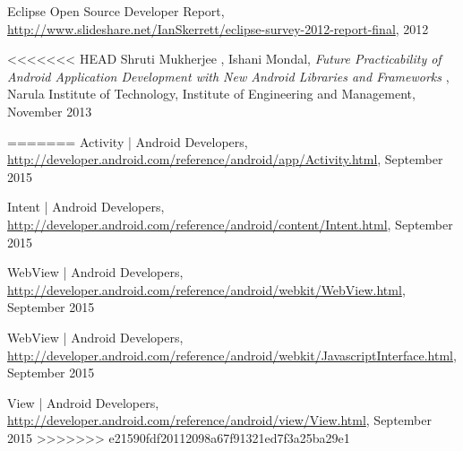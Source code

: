 \begin{thebibliography}{9}
	Eclipse Open Source Developer Report, 
	\url{http://www.slideshare.net/IanSkerrett/eclipse-survey-2012-report-final},
	2012
	
<<<<<<< HEAD
	Shruti Mukherjee , Ishani Mondal, 
	\emph{Future Practicability of Android Application Development with New Android Libraries and Frameworks },
	Narula Institute of Technology, 
	Institute of Engineering and Management,
	November 2013 
	
=======
	Activity | Android Developers,
	\url{http://developer.android.com/reference/android/app/Activity.html},
	September 2015
	
	Intent | Android Developers,
	\url{http://developer.android.com/reference/android/content/Intent.html},
	September 2015

	WebView | Android Developers,
	\url{http://developer.android.com/reference/android/webkit/WebView.html},
	September 2015

	WebView | Android Developers,
	\url{http://developer.android.com/reference/android/webkit/JavascriptInterface.html},
	September 2015

	View | Android Developers,
	\url{http://developer.android.com/reference/android/view/View.html},
	September 2015	
>>>>>>> e21590fdf20112098a67f91321ed7f3a25ba29e1
\end{thebibliography}